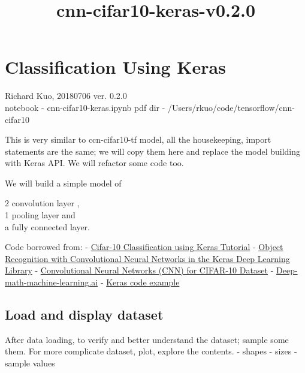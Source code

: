 \documentclass[11pt]{article}
\title{cnn-cifar10-keras-v0.2.0}
\begin{document}
    
    
    \maketitle
    
    

    
    \hypertarget{classification-using-keras}{%
\section{Classification Using Keras}\label{classification-using-keras}}

Richard Kuo, 20180706 ver. 0.2.0\\
notebook - cnn-cifar10-keras.ipynb pdf dir -
/Users/rkuo/code/tensorflow/cnn-cifar10

This is very similar to ccn-cifar10-tf model, all the housekeeping,
import statements are the same; we will copy them here and replace the
model building with Keras API. We will refactor some code too.

We will build a simple model of

2 convolution layer ,\\
1 pooling layer and\\
a fully connected layer.

Code borrowed from: -
\href{https://blog.plon.io/tutorials/cifar-10-classification-using-keras-tutorial/}{Cifar-10
Classification using Keras Tutorial} -
\href{https://machinelearningmastery.com/object-recognition-convolutional-neural-networks-keras-deep-learning-library/}{Object
Recognition with Convolutional Neural Networks in the Keras Deep
Learning Library} -
\href{http://parneetk.github.io/blog/cnn-cifar10/}{Convolutional Neural
Networks (CNN) for CIFAR-10 Dataset} -
\href{https://github.com/Madhu009/Deep-math-machine-learning.ai/blob/master/Neural_Networks/Convolutional_NN_Tensorflow.ipynb}{Deep-math-machine-learning.ai}
-
\href{https://github.com/keras-team/keras/blob/master/examples/cifar10_cnn.py}{Keras
code example}

    \hypertarget{load-and-display-dataset}{%
\subsection{Load and display dataset}\label{load-and-display-dataset}}

After data loading, to verify and better understand the dataset; sample
some them. For more complicate dataset, plot, explore the contents. -
shapes - sizes - sample values
\end{document}
